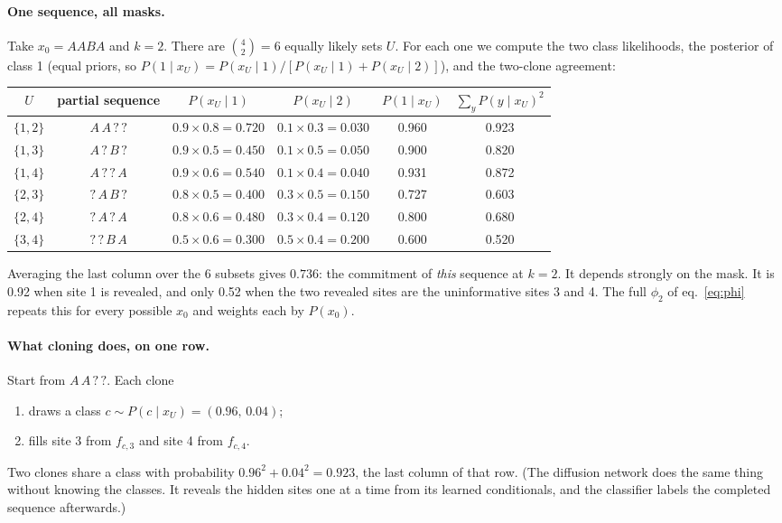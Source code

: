 \documentclass[11pt,a4paper]{article}
\begin{document}
\paragraph{One sequence, all masks.} Take $x_0=AABA$ and $k=2$. There are $\binom42=6$ equally likely sets $U$. For each
one we compute the two class likelihoods, the posterior of class 1 (equal priors, so
$P(1\mid x_U)=P(x_U\mid1)/[P(x_U\mid1)+P(x_U\mid2)]$), and the two-clone agreement:
\begin{center}
\begin{tabular}{cccccc}
\toprule
$U$ & partial sequence & $P(x_U\mid1)$ & $P(x_U\mid2)$ & $P(1\mid x_U)$ & $\sum_yP(y\mid x_U)^2$\\
\midrule
$\{1,2\}$ & $A\,A\,?\,?$ & $0.9\times0.8=0.720$ & $0.1\times0.3=0.030$ & 0.960 & 0.923\\
$\{1,3\}$ & $A\,?\,B\,?$ & $0.9\times0.5=0.450$ & $0.1\times0.5=0.050$ & 0.900 & 0.820\\
$\{1,4\}$ & $A\,?\,?\,A$ & $0.9\times0.6=0.540$ & $0.1\times0.4=0.040$ & 0.931 & 0.872\\
$\{2,3\}$ & $?\,A\,B\,?$ & $0.8\times0.5=0.400$ & $0.3\times0.5=0.150$ & 0.727 & 0.603\\
$\{2,4\}$ & $?\,A\,?\,A$ & $0.8\times0.6=0.480$ & $0.3\times0.4=0.120$ & 0.800 & 0.680\\
$\{3,4\}$ & $?\,?\,B\,A$ & $0.5\times0.6=0.300$ & $0.5\times0.4=0.200$ & 0.600 & 0.520\\
\bottomrule
\end{tabular}
\end{center}
Averaging the last column over the 6 subsets gives $0.736$: the commitment of \emph{this} sequence at $k=2$. It depends
strongly on the mask. It is 0.92 when site 1 is revealed, and only 0.52 when the two revealed sites are the uninformative
sites 3 and 4. The full $\phi_2$ of eq.~\eqref{eq:phi} repeats this for every possible $x_0$ and weights each by $P(x_0)$.

\paragraph{What cloning does, on one row.} Start from $A\,A\,?\,?$. Each clone
\begin{enumerate}[nosep]
\item draws a class $c\sim P(c\mid x_U)=(0.96,\,0.04)$;
\item fills site 3 from $f_{c,3}$ and site 4 from $f_{c,4}$.
\end{enumerate}
Two clones share a class with probability $0.96^2+0.04^2=0.923$, the last column of that row. (The diffusion network
does the same thing without knowing the classes. It reveals the hidden sites one at a time from its learned conditionals,
and the classifier labels the completed sequence afterwards.)
\end{document}
